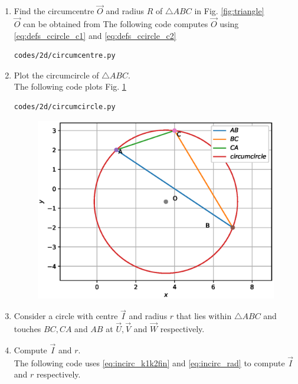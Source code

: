 \renewcommand{\theequation}{\theenumi}
\begin{enumerate}[label=\arabic*.,ref=\thesubsection.\theenumi]

\item Find the circumcentre $\vec{O}$ and radius $R$ of $\triangle ABC$ in Fig. \ref{fig:triangle}
\\
\solution $\vec{O}$ can be obtained from 
%
The following code computes $\vec{O}$ using \eqref{eq:defs_ccircle_c1} and \eqref{eq:defs_ccircle_c2}
\begin{lstlisting}
codes/2d/circumcentre.py
\end{lstlisting}
\item Plot the circumcircle of $\triangle ABC$.
\\
\solution The following code plots Fig. \ref{fig:circumcircle}
\begin{lstlisting}
codes/2d/circumcircle.py
\end{lstlisting}
\begin{figure}
\centering
\includegraphics[width=\columnwidth]{./circle/figs/circumcircle.eps}
\caption{}
\label{fig:circumcircle}
\end{figure}


\item Consider a circle with centre $\vec{I}$ and radius $r$ that lies within $\triangle ABC$ and touches 
$BC, CA$ and $AB$ at $\vec{U}, \vec{V}$ and $\vec{W}$ respectively.

\item Compute $\vec{I}$ and $r$.
\\
\solution The following code uses \eqref{eq:incirc_k1k2fin}  and \eqref{eq:incirc_rad} to compute $\vec{I}$ and  $r$ respectively.



\end{enumerate}
